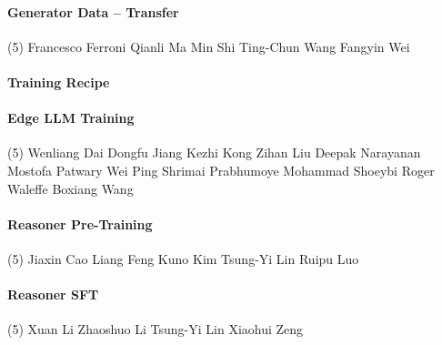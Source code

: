 \paragraph{Generator Data -- Transfer} \mbox{}
\vspace{-0.32\baselineskip}
\begingroup
\footnotesize
\begin{tasks}[label=\relax, label-width=0pt, item-indent=4pt](5)
\task Francesco Ferroni
\task Qianli Ma
\task Min Shi
\task Ting-Chun Wang
\task Fangyin Wei
\end{tasks}
\endgroup

\paragraph{Training Recipe} \mbox{}
\vspace{-0.32\baselineskip}\paragraph{\footnotesize Edge LLM Training} \mbox{}
\vspace{-0.32\baselineskip}
\begingroup
\footnotesize
\begin{tasks}[label=\relax, label-width=0pt, item-indent=4pt](5)
\task Wenliang Dai
\task Dongfu Jiang
\task Kezhi Kong
\task Zihan Liu
\task Deepak Narayanan
\task Mostofa Patwary
\task Wei Ping
\task Shrimai Prabhumoye
\task Mohammad Shoeybi
\task Roger Waleffe
\task Boxiang Wang
\end{tasks}
\endgroup

\vspace{-0.32\baselineskip}\paragraph{\footnotesize Reasoner Pre-Training} \mbox{}
\vspace{-0.32\baselineskip}
\begingroup
\footnotesize
\begin{tasks}[label=\relax, label-width=0pt, item-indent=4pt](5)
\task Jiaxin Cao
\task Liang Feng
\task Kuno Kim
\task Tsung-Yi Lin
\task Ruipu Luo
\end{tasks}
\endgroup

\vspace{-0.32\baselineskip}\paragraph{\footnotesize Reasoner SFT} \mbox{}
\vspace{-0.32\baselineskip}
\begingroup
\footnotesize
\begin{tasks}[label=\relax, label-width=0pt, item-indent=4pt](5)
\task Xuan Li
\task Zhaoshuo Li
\task Tsung-Yi Lin
\task Xiaohui Zeng
\end{tasks}
\endgroup

